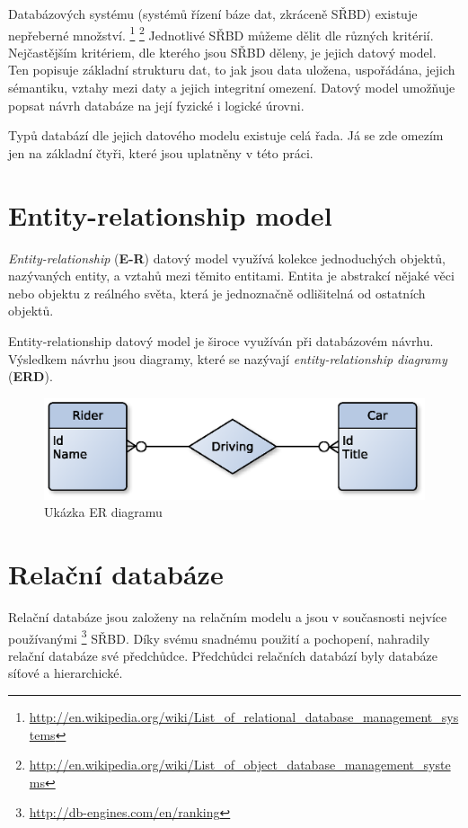 Databázových systému (systémů řízení báze dat, zkráceně SŘBD) existuje nepřeberné množství.
\footnote{\label{rdbms_list}\url{http://en.wikipedia.org/wiki/List_of_relational_database_management_systems}}
\footnote{\url{http://en.wikipedia.org/wiki/List_of_object_database_management_systems}}
Jednotlivé SŘBD můžeme dělit dle různých kritérií. Nejčastějším kritériem, dle kterého jsou SŘBD děleny, je jejich datový model.
Ten popisuje základní strukturu dat, to jak jsou data uložena, uspořádána, jejich sémantiku, vztahy mezi daty a jejich integritní omezení. Datový model umožňuje popsat návrh databáze na její fyzické i logické úrovni.\cite[s.~945--964]{korth:dbsc}

Typů databází dle jejich datového modelu existuje celá řada. Já se zde omezím jen na základní čtyři, které jsou uplatněny v této práci.

\section{Entity-relationship model}
\emph{Entity-relationship} (\textbf{E-R}) datový model využívá kolekce jednoduchých objektů, nazývaných entity, a vztahů mezi těmito entitami. Entita je abstrakcí nějaké věci nebo objektu z reálného světa, která je jednoznačně odlišitelná od ostatních objektů. 

Entity-relationship datový model je široce využíván při databázovém návrhu. Výsledkem návrhu jsou diagramy, které se nazývají \emph{entity-relationship diagramy} (\textbf{ERD}).
\begin{figure}[h]
  \begin{center}
    \includegraphics[width=40em]{obr/era}
    \caption{Ukázka ER diagramu}
    \label{fig:era}
  \end{center}
\end{figure}
\section{Relační databáze}
Relační databáze jsou založeny na relačním modelu a jsou v současnosti nejvíce používanými \footnote{\label{dbms_rank}\url{http://db-engines.com/en/ranking}} SŘBD. Díky svému snadnému použití a pochopení, nahradily relační databáze své předchůdce. Předchůdci relačních databází byly databáze síťové a hierarchické.
